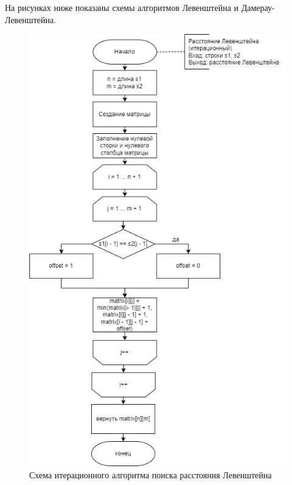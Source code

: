 \documentclass[a4paper,14pt, unknownkeysallowed]{extreport}
\begin{document}
	На рисунках ниже показаны схемы алгоритмов Левенштейна и Дамерау-Левен\-штейна.
	
	\begin{figure}
		\centering
		\includegraphics[width=0.8\linewidth]{Lev}
		\caption{Схема итерационного алгоритма поиска расстояния Левенштейна}
		\label{fig:schema_bucket_1}
	\end{figure}
	
\end{document}
